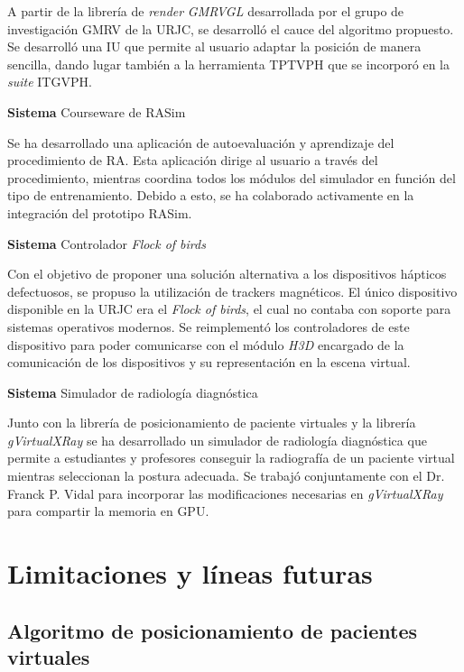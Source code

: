 A partir de la librería de \emph{render} \emph{GMRVGL} desarrollada por el grupo de investigación \ac{GMRV} de la \ac{URJC}, se desarrolló el cauce del algoritmo propuesto. Se desarrolló una \ac{IU} que permite al usuario adaptar la posición de manera sencilla, dando lugar también a la herramienta \ac{TPTVPH} que se incorporó en la \emph{suite} \ac{ITGVPH}.

\textbf{ Sistema } Courseware de \ac{RASim}

Se ha desarrollado una aplicación de autoevaluación y aprendizaje del procedimiento de \ac{RA}. Esta aplicación dirige al usuario a través del procedimiento, mientras coordina todos los módulos del simulador en función del tipo de entrenamiento. Debido a esto, se ha colaborado activamente en la integración del prototipo \ac{RASim}.

\textbf{ Sistema } Controlador \emph{Flock of birds} 

Con el objetivo de proponer una solución alternativa a los dispositivos hápticos defectuosos, se propuso la utilización de \acs{tracker}s magnéticos. El único dispositivo disponible en la \ac{URJC} era el \emph{Flock of birds}, el cual no contaba con soporte para sistemas operativos modernos. Se reimplementó los controladores de este dispositivo para poder comunicarse con el módulo \emph{H3D} encargado de la comunicación de los dispositivos y su representación en la escena virtual.


\textbf{ Sistema } Simulador de radiología diagnóstica

Junto con la librería de posicionamiento de paciente virtuales y la librería \emph{gVirtualXRay} se ha desarrollado un simulador de radiología diagnóstica que permite a estudiantes y profesores conseguir la radiografía de un paciente virtual mientras seleccionan la postura adecuada. Se trabajó conjuntamente con el Dr. Franck P. Vidal para incorporar las modificaciones necesarias en \emph{gVirtualXRay} para compartir la memoria en \acs{GPU}. 







\section{Limitaciones y líneas futuras}
\label{conclu:future}

\subsection{Algoritmo de posicionamiento de pacientes virtuales}

